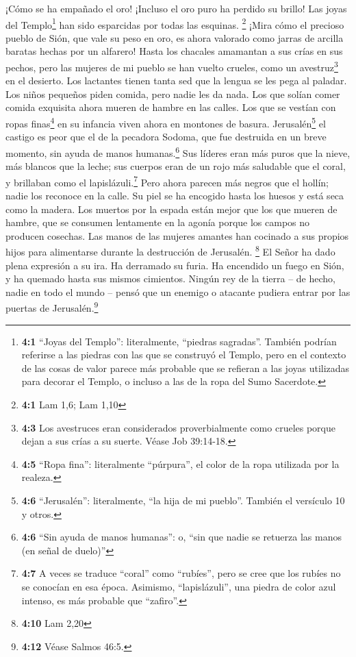  ¡Cómo se ha empañado el oro! ¡Incluso el oro puro ha
perdido su brillo! Las joyas del Templo\footnote{\textbf{4:1} ``Joyas
  del Templo'': literalmente, ``piedras sagradas''. También podrían
  referirse a las piedras con las que se construyó el Templo, pero en el
  contexto de las cosas de valor parece más probable que se refieran a
  las joyas utilizadas para decorar el Templo, o incluso a las de la
  ropa del Sumo Sacerdote.} han sido esparcidas por todas las esquinas.
\footnote{\textbf{4:1} Lam 1,6; Lam 1,10}  ¡Mira cómo el
precioso pueblo de Sión, que vale su peso en oro, es ahora valorado como
jarras de arcilla baratas hechas por un alfarero!  Hasta
los chacales amamantan a sus crías en sus pechos, pero las mujeres de mi
pueblo se han vuelto crueles, como un avestruz\footnote{\textbf{4:3} Los
  avestruces eran considerados proverbialmente como crueles porque dejan
  a sus crías a su suerte. Véase Job 39:14-18.} en el desierto.
 Los lactantes tienen tanta sed que la lengua se les pega
al paladar. Los niños pequeños piden comida, pero nadie les da nada.
 Los que solían comer comida exquisita ahora mueren de
hambre en las calles. Los que se vestían con ropas finas\footnote{\textbf{4:5}
  ``Ropa fina'': literalmente ``púrpura'', el color de la ropa utilizada
  por la realeza.} en su infancia viven ahora en montones de basura.
 Jerusalén\footnote{\textbf{4:6} ``Jerusalén'':
  literalmente, ``la hija de mi pueblo''. También el versículo 10 y
  otros.} el castigo es peor que el de la pecadora Sodoma, que fue
destruida en un breve momento, sin ayuda de manos humanas.\footnote{\textbf{4:6}
  ``Sin ayuda de manos humanas'': o, ``sin que nadie se retuerza las
  manos (en señal de duelo)''}  Sus líderes eran más puros
que la nieve, más blancos que la leche; sus cuerpos eran de un rojo más
saludable que el coral, y brillaban como el lapislázuli.\footnote{\textbf{4:7}
  A veces se traduce ``coral'' como ``rubíes'', pero se cree que los
  rubíes no se conocían en esa época. Asimismo, ``lapislázuli'', una
  piedra de color azul intenso, es más probable que ``zafiro''.}
 Pero ahora parecen más negros que el hollín; nadie los
reconoce en la calle. Su piel se ha encogido hasta los huesos y está
seca como la madera.  Los muertos por la espada están
mejor que los que mueren de hambre, que se consumen lentamente en la
agonía porque los campos no producen cosechas.  Las manos
de las mujeres amantes han cocinado a sus propios hijos para alimentarse
durante la destrucción de Jerusalén. \footnote{\textbf{4:10} Lam 2,20}
 El Señor ha dado plena expresión a su ira. Ha derramado
su furia. Ha encendido un fuego en Sión, y ha quemado hasta sus mismos
cimientos.  Ningún rey de la tierra -- de hecho, nadie en
todo el mundo -- pensó que un enemigo o atacante pudiera entrar por las
puertas de Jerusalén.\footnote{\textbf{4:12} Véase Salmos 46:5.}

